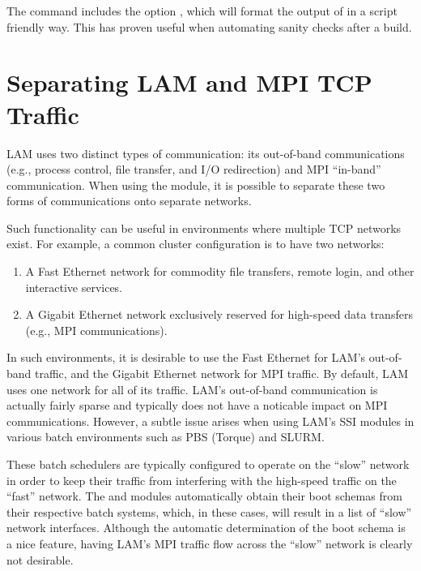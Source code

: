 The  command includes the option ,
which will format the output of  in a script friendly
way.  This has proven useful when automating sanity checks after a
build.



\section{Separating LAM and MPI TCP Traffic}
\label{sec:postbuild:mpi_hostmap}


LAM uses two distinct types of communication: its out-of-band
communications (e.g., process control, file transfer, and I/O
redirection) and MPI ``in-band'' communication.  When using the
  module, it is possible to separate these two
forms of communications onto separate networks.  

Such functionality can be useful in environments where multiple TCP
networks exist.  For example, a common cluster configuration is to
have two networks:

\begin{enumerate}
\item A Fast Ethernet network for commodity file transfers, remote
  login, and other interactive services.

\item A Gigabit Ethernet network exclusively reserved for high-speed
  data transfers (e.g., MPI communications).
\end{enumerate}

In such environments, it is desirable to use the Fast Ethernet for
LAM's out-of-band traffic, and the Gigabit Ethernet network for MPI
traffic.  By default, LAM uses one network for all of its traffic.
LAM's out-of-band communication is actually fairly sparse and
typically does not have a noticable impact on MPI communications.
However, a subtle issue arises when using LAM's  SSI
modules in various batch environments such as PBS (Torque) and SLURM.

These batch schedulers are typically configured to operate on the
``slow'' network in order to keep their traffic from interfering with
the high-speed traffic on the ``fast'' network.  The  and
 modules automatically obtain their boot schemas from
their respective batch systems, which, in these cases, will result in
a list of ``slow'' network interfaces.  Although the automatic
determination of the boot schema is a nice feature, having LAM's MPI
traffic flow across the ``slow'' network is clearly not desirable.

